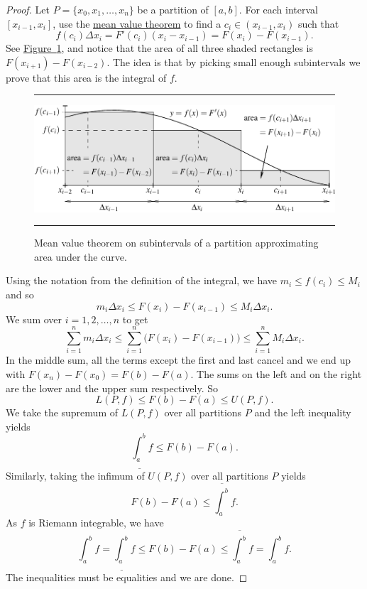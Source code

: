 \documentclass[12pt]{book}
\newenvironment{myfigureht}{%
\begin{figure}[h!t]
\noindent\rule{\textwidth}{0.4pt}\vspace{12pt}\par\centering}%
{\par\noindent\rule{\textwidth}{0.4pt}
\end{figure}}
\theoremstyle{plain}
\theoremstyle{remark}
\theoremstyle{definition}
\theoremstyle{exercise}
\theoremstyle{example}
\newcommand{\figureref}[1]{\hyperref[#1]{Figure~\ref*{#1}}}
\begin{document}
\begin{proof}
Let $P = \{ x_0, x_1, \ldots, x_n \}$ be a partition of $[a,b]$.
For each interval $[x_{i-1},x_i]$, use the
\hyperref[thm:mvt]{mean value theorem} to find a
$c_i \in (x_{i-1},x_i)$ such that
\begin{equation*}
f(c_i) \Delta x_i = F'(c_i) (x_i - x_{i-1}) = F(x_i) - F(x_{i-1}) .
\end{equation*}
See \figureref{fig:fundthmfig}, and
notice that the area of all
three shaded rectangles is $F(x_{i+1})-F(x_{i-2})$.
The idea is that by picking small enough subintervals
we prove that this area is the integral of $f$.
\begin{myfigureht}
\includegraphics{figures/fundthmfig}
\caption{Mean value theorem on subintervals of a partition
approximating area under the curve.\label{fig:fundthmfig}}
\end{myfigureht}

Using the notation from the definition of the integral, we have
$m_i \leq f(c_i) \leq M_i$ and so
\begin{equation*}
m_i \Delta x_i \leq F(x_i) - F(x_{i-1}) \leq M_i \Delta x_i .
\end{equation*}
We sum over $i = 1,2, \ldots, n$ to get
\begin{equation*}
\sum_{i=1}^n m_i \Delta x_i
\leq \sum_{i=1}^n \bigl(F(x_i) - F(x_{i-1}) \bigr)
\leq \sum_{i=1}^n M_i \Delta x_i .
\end{equation*}
In the middle sum, all the terms except the first and last cancel 
and we end up with $F(x_n)-F(x_0) = F(b)-F(a)$.  The sums on the left
and on the right are the lower and the upper sum respectively.  So
\begin{equation*}
L(P,f) \leq F(b)-F(a) \leq U(P,f) .
\end{equation*}
We take the supremum of $L(P,f)$ over all partitions $P$ and the left inequality
yields 
\begin{equation*}
\underline{\int_a^b} f \leq F(b)-F(a) .
\end{equation*}
Similarly, taking
the infimum of $U(P,f)$ over all partitions $P$ yields
\begin{equation*}
F(b)-F(a) \leq \overline{\int_a^b} f .
\end{equation*}
As $f$ is Riemann integrable, we have
\begin{equation*}
\int_a^b f =
\underline{\int_a^b} f \leq F(b)-F(a) \leq \overline{\int_a^b} f
= \int_a^b f .
\end{equation*}
The inequalities must be equalities and we are done.
\end{proof}
\end{document}
